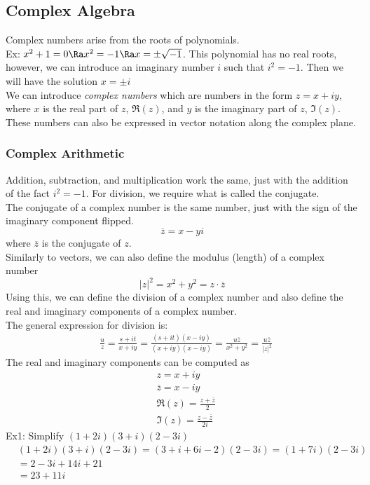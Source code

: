 \subsection{Complex Algebra}
Complex numbers arise from the roots of polynomials.\\
Ex: $x^2+1=0\Ra x^2=-1 \Ra x=\pm\sqrt{-1}$. This polynomial has no real roots, however, we can introduce an imaginary number $i$ such that $i^2=-1$. Then we will have the solution $x=\pm i$\\
We can introduce \textit{complex numbers} which are numbers in the form $z=x+iy$, where $x$ is the real part of $z$, $\Re(z)$, and $y$ is the imaginary part of $z$, $\Im(z)$. 
These numbers can also be expressed in vector notation along the complex plane.


\subsubsection{Complex Arithmetic}
Addition, subtraction, and multiplication work the same, just with the addition of the fact $i^2=-1$. For division, we require what is called the conjugate.\\
The conjugate of a complex number is the same number, just with the sign of the imaginary component flipped.
$$\overline{z}=x-yi$$
where $\overline{z}$ is the conjugate of $z$.\\
Similarly to vectors, we can also define the modulus (length) of a complex number
$$|z|^2=x^2+y^2=z\cdot\overline{z}$$
Using this, we can define the division of a complex number and also define the real and imaginary components of a complex number.\\
The general expression for division is:
\begin{align*}
    &\frac{u}{z}=\frac{s+it}{x+iy}=\frac{(s+it)(x-iy)}{(x+iy)(x-iy)}=\frac{u\overline{z}}{x^2+y^2}=\frac{u\overline{z}}{|z|^2}
\end{align*}
The real and imaginary components can be computed as
\begin{align*}
    &z=x+iy\\
    &\overline{z}=x-iy\\
    &\Re(z)=\frac{z+\overline{z}}{2}\\
    &\Im(z)=\frac{z-\overline{z}}{2i}
\end{align*}
Ex1: Simplify $(1+2i)(3+i)(2-3i)$
\begin{align*}
    &(1+2i)(3+i)(2-3i)=(3+i+6i-2)(2-3i)=(1+7i)(2-3i)\\
    &=2-3i+14i+21\\
    &=23+11i
\end{align*}
